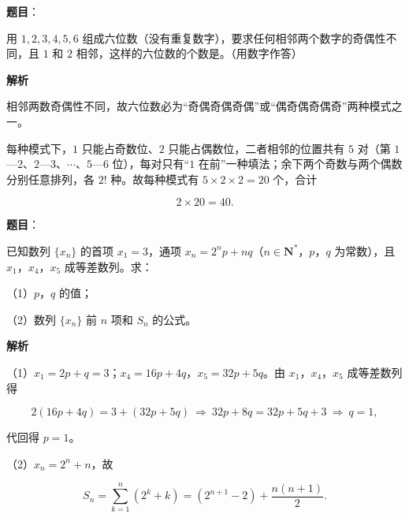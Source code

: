 \begin{answer}

\textbf{题目}：

用 $1,2,3,4,5,6$ 组成六位数（没有重复数字），要求任何相邻两个数字的奇偶性不同，且 $1$ 和 $2$ 相邻，这样的六位数的个数是\gkblank{}。（用数字作答）

\textbf{解析}

相邻两数奇偶性不同，故六位数必为“奇偶奇偶奇偶”或“偶奇偶奇偶奇”两种模式之一。

每种模式下，$1$ 只能占奇数位、$2$ 只能占偶数位，二者相邻的位置共有 $5$ 对（第 $1$—$2$、$2$—$3$、$\cdots$、$5$—$6$ 位），每对只有“$1$ 在前”一种填法；余下两个奇数与两个偶数分别任意排列，各 $2!$ 种。故每种模式有 $5\times2\times2=20$ 个，合计

\nopagebreak[4]
\[2\times20=40.\]


\end{answer}
\begin{answer}

\textbf{题目}：

已知数列 $\{x_n\}$ 的首项 $x_1=3$，通项 $x_n=2^np+nq$（$n\in\mathbf N^*$，$p$，$q$ 为常数），且 $x_1$，$x_4$，$x_5$ 成等差数列。求：

（1）$p$，$q$ 的值；

（2）数列 $\{x_n\}$ 前 $n$ 项和 $S_n$ 的公式。

\textbf{解析}

（1）$x_1=2p+q=3$；$x_4=16p+4q$，$x_5=32p+5q$。由 $x_1$，$x_4$，$x_5$ 成等差数列得

\nopagebreak[4]
\[2(16p+4q)=3+(32p+5q)\ \Longrightarrow\ 32p+8q=32p+5q+3\ \Longrightarrow\ q=1,\]

代回得 $p=1$。

（2）$x_n=2^n+n$，故

\nopagebreak[4]
\[S_n=\sum_{k=1}^n\left(2^k+k\right)=\left(2^{n+1}-2\right)+\frac{n(n+1)}2.\]


\end{answer}
